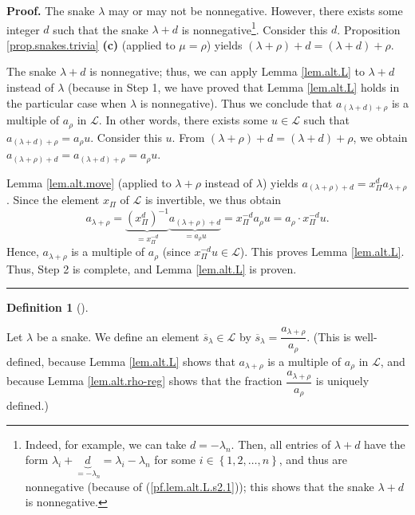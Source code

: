 \documentclass[numbers=enddot,12pt,final,onecolumn,notitlepage]{scrartcl}%
\theoremstyle{definition}
\newtheorem{defi}[theo]{Definition}
\newenvironment{definition}[1][]
{\begin{defi}[#1]\begin{leftbar}}
{\end{leftbar}\end{defi}}
\newenvironment{proof}[1][Proof]{\noindent\textbf{#1.} }{\ \rule{0.5em}{0.5em}}
\begin{document}
\begin{proof}
The snake $\lambda$ may or may not be nonnegative. However, there exists some
integer $d$ such that the snake $\lambda+d$ is nonnegative\footnote{Indeed,
for example, we can take $d=-\lambda_{n}$. Then, all entries of $\lambda+d$
have the form $\lambda_{i}+\underbrace{d}_{=-\lambda_{n}}=\lambda_{i}%
-\lambda_{n}$ for some $i\in\left\{  1,2,\ldots,n\right\}  $, and thus are
nonnegative (because of (\ref{pf.lem.alt.L.s2.1})); this shows that the snake
$\lambda+d$ is nonnegative.}. Consider this $d$. Proposition
\ref{prop.snakes.trivia} \textbf{(c)} (applied to $\mu=\rho$) yields $\left(
\lambda+\rho\right)  +d=\left(  \lambda+d\right)  +\rho$.

The snake $\lambda+d$ is nonnegative; thus, we can apply Lemma \ref{lem.alt.L}
to $\lambda+d$ instead of $\lambda$ (because in Step 1, we have proved that
Lemma \ref{lem.alt.L} holds in the particular case when $\lambda$ is
nonnegative). Thus we conclude that $a_{\left(  \lambda+d\right)  +\rho}$ is a
multiple of $a_{\rho}$ in $\mathcal{L}$. In other words, there exists some
$u\in\mathcal{L}$ such that $a_{\left(  \lambda+d\right)  +\rho}=a_{\rho}u$.
Consider this $u$. From $\left(  \lambda+\rho\right)  +d=\left(
\lambda+d\right)  +\rho$, we obtain $a_{\left(  \lambda+\rho\right)
+d}=a_{\left(  \lambda+d\right)  +\rho}=a_{\rho}u$.

Lemma \ref{lem.alt.move} (applied to $\lambda+\rho$ instead of $\lambda$)
yields $a_{\left(  \lambda+\rho\right)  +d}=x_{\Pi}^{d}a_{\lambda+\rho}$.
Since the element $x_{\Pi}$ of $\mathcal{L}$ is invertible, we thus obtain
\[
a_{\lambda+\rho}=\underbrace{\left(  x_{\Pi}^{d}\right)  ^{-1}}_{=x_{\Pi}%
^{-d}}\underbrace{a_{\left(  \lambda+\rho\right)  +d}}_{=a_{\rho}u}=x_{\Pi
}^{-d}a_{\rho}u=a_{\rho}\cdot x_{\Pi}^{-d}u.
\]
Hence, $a_{\lambda+\rho}$ is a multiple of $a_{\rho}$ (since $x_{\Pi}^{-d}%
u\in\mathcal{L}$). This proves Lemma \ref{lem.alt.L}. Thus, Step 2 is
complete, and Lemma \ref{lem.alt.L} is proven.
\end{proof}

\begin{definition}
\label{def.alt.sbar}Let $\lambda$ be a snake. We define an element
$\overline{s}_{\lambda}\in\mathcal{L}$ by $\overline{s}_{\lambda}%
=\dfrac{a_{\lambda+\rho}}{a_{\rho}}$. (This is well-defined, because Lemma
\ref{lem.alt.L} shows that $a_{\lambda+\rho}$ is a multiple of $a_{\rho}$ in
$\mathcal{L}$, and because Lemma \ref{lem.alt.rho-reg} shows that the fraction
$\dfrac{a_{\lambda+\rho}}{a_{\rho}}$ is uniquely defined.)
\end{definition}
\end{document}
